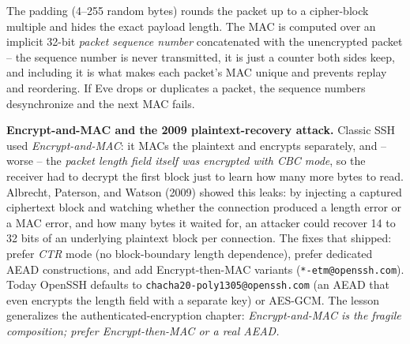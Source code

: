 The padding (4--255 random bytes) rounds the packet up to a cipher-block multiple and hides the exact payload length. The MAC is computed over an implicit 32-bit \emph{packet sequence number} concatenated with the unencrypted packet -- the sequence number is never transmitted, it is just a counter both sides keep, and including it is what makes each packet's MAC unique and prevents replay and reordering. If Eve drops or duplicates a packet, the sequence numbers desynchronize and the next MAC fails.

\begin{attackbox}
\textbf{Encrypt-and-MAC and the 2009 plaintext-recovery attack.} Classic SSH used \emph{Encrypt-and-MAC}: it MACs the plaintext and encrypts separately, and -- worse -- the \emph{packet length field itself was encrypted with CBC mode}, so the receiver had to decrypt the first block just to learn how many more bytes to read. Albrecht, Paterson, and Watson (2009) showed this leaks: by injecting a captured ciphertext block and watching whether the connection produced a length error or a MAC error, and how many bytes it waited for, an attacker could recover 14 to 32 bits of an underlying plaintext block per connection. The fixes that shipped: prefer \emph{CTR} mode (no block-boundary length dependence), prefer dedicated AEAD constructions, and add Encrypt-then-MAC variants (\texttt{*-etm@openssh.com}). Today OpenSSH defaults to \texttt{chacha20-poly1305@openssh.com} (an AEAD that even encrypts the length field with a separate key) or AES-GCM. The lesson generalizes the authenticated-encryption chapter: \emph{Encrypt-and-MAC is the fragile composition; prefer Encrypt-then-MAC or a real AEAD.}
\end{attackbox}

